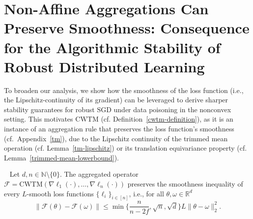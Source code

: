 \documentclass[twoside,11pt]{article}
\newcommand\mb{\mathbb}
\newcommand{\R}{\mathbb{R}}
\newcommand{\F}{\mathcal{F}}
\begin{document}
\section{Non-Affine Aggregations Can Preserve Smoothness: Consequence for the Algorithmic Stability of Robust Distributed Learning}\label{deferred-sec-5}
To broaden our analysis, we show how the smoothness of the loss function (i.e., the Lipschitz-continuity of its gradient) can be leveraged to derive sharper stability guarantees for robust $\mathrm{SGD}$ under data poisoning in the nonconvex setting. 
This motivates $\mathrm{CWTM}$ (cf. Definition~\ref{cwtm-definition}), as it is an instance of an aggregation rule that preserves the loss function's smoothness (cf.~Appendix~\ref{tm}), due to the Lipschitz continuity of the trimmed mean operation (cf. Lemma~\ref{tm-lipschitz}) or its translation equivariance property (cf. Lemma~\ref{trimmed-mean-lowerbound}).
\begin{lemma}~\label{lem:cwtm-smoothness}
    Let $d, n \in \mb{N} \setminus \{0\}$.
    The aggregated operator $\F = \mathrm{CWTM}(\nabla \ell_1(\cdot), \ldots, \nabla \ell_n(\cdot))$ preserves the smoothness inequality of every $L$-smooth loss functions $\{ \ell_i \}_{i \in [n]}$, i.e., for all $\theta, \omega \in \R^d$
    \[
        \| \F(\theta) - \F(\omega) \| \leq \min\{\frac{n}{n-2f}, \sqrt{n}, \sqrt{d}\} L \| \theta - \omega \|_2^2.
    \]
\end{lemma}
\end{document}
